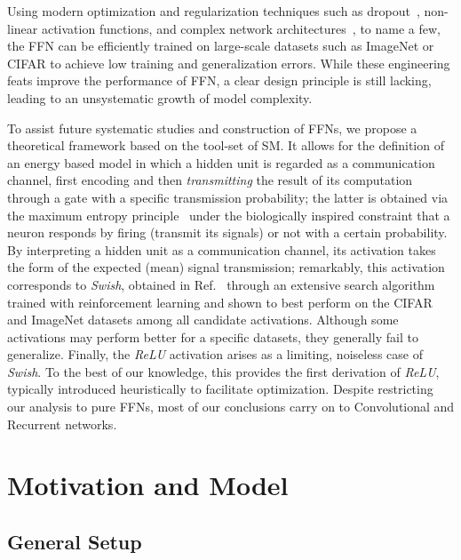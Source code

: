 \documentclass{article}
\begin{document}
Using modern optimization and regularization techniques such as dropout~\cite{srivastava2014}, non-linear activation functions, and complex network architectures~\cite{Krizhevsky}, to name a few, the FFN can be efficiently trained on large-scale datasets such as ImageNet or CIFAR to achieve low training and generalization errors.
While these engineering feats improve the performance of FFN, a clear design principle is still lacking, leading to an unsystematic growth of model complexity.

To assist future systematic studies and construction of FFNs, we propose a theoretical framework based on the tool-set of SM. It allows for the definition of an energy based model in which a hidden unit is regarded as a communication channel, first encoding and then {\it transmitting} the result of its computation through a gate with a specific transmission probability;  the latter is obtained via the maximum entropy principle~\cite{zecchina, jaynes} under the biologically inspired constraint that a neuron responds by firing (transmit its signals) or not with a certain probability.
By interpreting a hidden unit as a communication channel, its activation takes the form of the expected (mean) signal transmission; remarkably, this activation corresponds to {\it Swish}, obtained in Ref.~\cite{elfwig, prajit} through an extensive search algorithm trained with reinforcement learning and shown to best perform on the CIFAR and ImageNet datasets among all candidate activations. Although some activations may perform better for a specific datasets, they generally fail to generalize. Finally, the {\it ReLU} activation arises as a limiting, noiseless case of {\it Swish}. To the best of our knowledge, this provides the first  derivation of {\it ReLU}, typically introduced heuristically to facilitate optimization. Despite restricting our analysis to pure FFNs, most of our conclusions carry on to Convolutional and Recurrent networks. %

\section{Motivation and Model} \label{sec:model}

\subsection{General Setup} \label{sub:setup}
\end{document}

